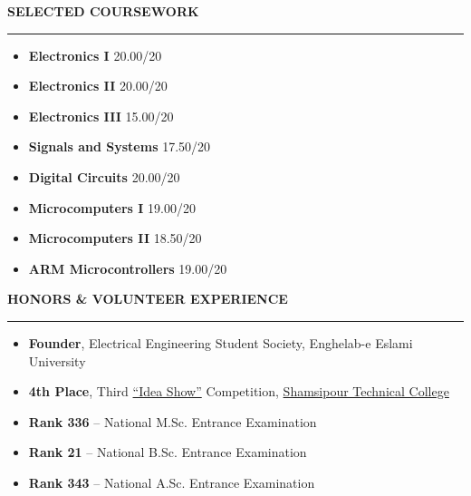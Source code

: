 \documentclass[10pt,a4paper,ragged2e]{altacv}
\renewcommand{\cvsection}[2][]{%
  \bigskip
  \ifstrequal{#1}{}{}{\marginpar{\vspace*{\dimexpr1pt-\baselineskip}\raggedright}}%
  {\color{heading}\Large\bfseries\MakeUppercase{#2}}\\[-1ex]%
  {\color{heading}\rule{\linewidth}{2pt}\par}\medskip
}
\begin{document}
\cvsection{Selected Coursework}

\noindent
\begin{minipage}[t]{0.485\linewidth}
\begin{itemize}
  \item \textbf{Electronics I} \hfill 20.00/20
  \item \textbf{Electronics II} \hfill 20.00/20
  \item \textbf{Electronics III} \hfill 15.00/20
  \item \textbf{Signals and Systems} \hfill 17.50/20
\end{itemize}
\end{minipage}\hfill
\begin{minipage}[t]{0.485\linewidth}
\begin{itemize}
  
  \item \textbf{Digital Circuits} \hfill 20.00/20
  \item \textbf{Microcomputers I} \hfill 19.00/20
  \item \textbf{Microcomputers II} \hfill 18.50/20
  \item \textbf{ARM Microcontrollers} \hfill 19.00/20
\end{itemize}
\end{minipage}

\cvsection{Honors \& Volunteer Experience}
\begin{itemize}
	\item \textbf{Founder}, Electrical Engineering Student Society, Enghelab-e Eslami University

\item \textbf{4th Place}, Third \href{https://shamsipour.tvu.ac.ir/fa/713554}{``Idea Show''} Competition, \href{https://shamsipour.tvu.ac.ir/fa/714120}{Shamsipour Technical College}

	\item \textbf{Rank 336} -- National M.Sc. Entrance Examination
	\item \textbf{Rank 21} -- National B.Sc. Entrance Examination
	\item \textbf{Rank 343} -- National A.Sc. Entrance Examination
\end{itemize}
\end{document}
